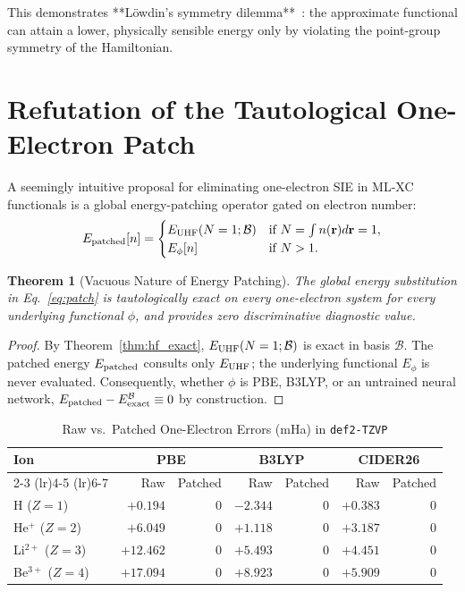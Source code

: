 \documentclass[journal]{IEEEtran}
\newtheorem{theorem}{Theorem}
\begin{document}
This demonstrates **Löwdin's symmetry dilemma**~\cite{Lowdin1963}: the approximate functional can attain a lower, physically sensible energy only by violating the point-group symmetry of the Hamiltonian.

\section{Refutation of the Tautological One-Electron Patch}
\label{sec:patch}

A seemingly intuitive proposal for eliminating one-electron SIE in ML-XC functionals is a global energy-patching operator gated on electron number:
\begin{equation}
E_{\rm patched}[n] =
\begin{cases}
E_{\rm UHF}(N=1; \mathcal{B}) & \text{if } N = \int n(\mathbf r) d\mathbf r = 1, \\
E_{\phi}[n] & \text{if } N > 1.
\end{cases}
\label{eq:patch}
\end{equation}

\begin{theorem}[Vacuous Nature of Energy Patching]
The global energy substitution in Eq.~\eqref{eq:patch} is tautologically exact on every one-electron system for every underlying functional $\phi$, and provides zero discriminative diagnostic value.
\end{theorem}
\begin{proof}
By Theorem~\ref{thm:hf_exact}, $E_{\rm UHF}(N=1; \mathcal{B})$ is exact in basis $\mathcal{B}$. The patched energy $E_{\rm patched}$ consults only $E_{\rm UHF}$; the underlying functional $E_\phi$ is never evaluated. Consequently, whether $\phi$ is PBE, B3LYP, or an untrained neural network, $E_{\rm patched} - E_{\rm exact}^{\mathcal{B}} \equiv 0$ by construction.
\end{proof}

\begin{table}[htbp]
\centering
\caption{Raw vs.\ Patched One-Electron Errors (mHa) in \texttt{def2-TZVP}}
\label{tab:patch_data}
\begin{tabular}{lrrrrrr}
\toprule
Ion & \multicolumn{2}{c}{PBE} & \multicolumn{2}{c}{B3LYP} & \multicolumn{2}{c}{CIDER26} \\
\cmidrule(lr){2-3} \cmidrule(lr){4-5} \cmidrule(lr){6-7}
 & Raw & Patched & Raw & Patched & Raw & Patched \\
\midrule
H ($Z=1$)       & $+0.194$  & $0$ & $-2.344$ & $0$ & $+0.383$ & $0$ \\
He$^+$ ($Z=2$)  & $+6.049$  & $0$ & $+1.118$ & $0$ & $+3.187$ & $0$ \\
Li$^{2+}$ ($Z=3$)& $+12.462$ & $0$ & $+5.493$ & $0$ & $+4.451$ & $0$ \\
Be$^{3+}$ ($Z=4$)& $+17.094$ & $0$ & $+8.923$ & $0$ & $+5.909$ & $0$ \\
\bottomrule
\end{tabular}
\end{table}
\end{document}
